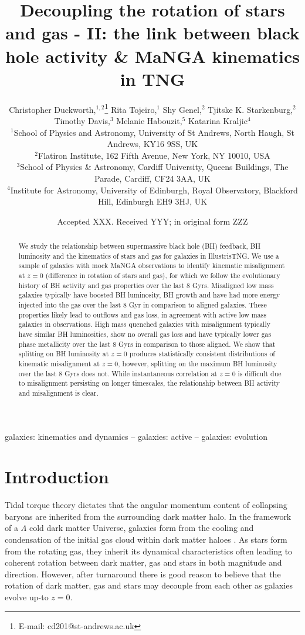 \documentclass[fleqn,usenatbib]{mnras}
\title[Decoupling the rotation of stars and gas - II]{Decoupling the rotation of stars and gas - II: the link between black hole activity \& MaNGA kinematics in TNG}
\author[C. Duckworth et al.]
{Christopher Duckworth,$^{1,2}$\thanks{E-mail: cd201@st-andrews.ac.uk}
Rita Tojeiro,$^{1}$
Shy Genel,$^{2}$ 
Tjitske K. Starkenburg,$^{2}$ \newauthor
Timothy Davis,$^{3}$
Melanie Habouzit,$^{5}$
Katarina Kraljic$^{4}$
\\
$^{1}$School of Physics and Astronomy, University of St Andrews, North Haugh, St Andrews, KY16 9SS, UK\\
$^{2}$Flatiron Institute, 162 Fifth Avenue, New York, NY 10010, USA\\
$^{3}$School of Physics \& Astronomy, Cardiff University, Queens Buildings, The Parade, Cardiff, CF24 3AA, UK\\
$^{4}$Institute for Astronomy, University of Edinburgh, Royal Observatory, Blackford Hill, Edinburgh EH9 3HJ, UK\\
}
\date{Accepted XXX. Received YYY; in original form ZZZ}
\begin{document}
\label{firstpage}
\pagerange{\pageref{firstpage}--\pageref{lastpage}}
\maketitle

\begin{abstract}
We study the relationship between supermassive black hole (BH) feedback, BH luminosity and the kinematics of stars and gas for galaxies in IllustrisTNG. We use a sample of galaxies with mock MaNGA observations to identify kinematic misalignment at $z=0$ (difference in rotation of stars and gas), for which we follow the evolutionary history of BH activity and gas properties over the last 8 Gyrs. Misaligned low mass galaxies typically have boosted BH luminosity, BH growth and have had more energy injected into the gas over the last 8 Gyr in comparison to aligned galaxies. These properties likely lead to outflows and gas loss, in agreement with active low mass galaxies in observations. High mass quenched galaxies with misalignment typically have similar BH luminosities, show no overall gas loss and have typically lower gas phase metallicity over the last 8 Gyrs in comparison to those aligned. We show that splitting on BH luminosity at $z=0$ produces statistically consistent distributions of kinematic misalignment at $z=0$, however, splitting on the maximum BH luminosity over the last 8 Gyrs does not. While instantaneous correlation at $z=0$ is difficult due to misalignment persisting on longer timescales, the relationship between BH activity and misalignment is clear.
\end{abstract}

\begin{keywords}
galaxies: kinematics and dynamics -- galaxies: active -- galaxies: evolution
\end{keywords}



\section{Introduction}
Tidal torque theory \citep[e.g.][]{hoyle1951, peebles1969} dictates that the angular momentum content of collapsing baryons are inherited from the surrounding dark matter halo. In the framework of a $\Lambda$ cold dark matter Universe, galaxies form from the cooling and condensation of the initial gas cloud within dark matter haloes \citep{fall1980, mo1998}. As stars form from the rotating gas, they inherit its dynamical characteristics often leading to coherent rotation between dark matter, gas and stars in both magnitude and direction. However, after turnaround there is good reason to believe that the rotation of dark matter, gas and stars may decouple from each other as galaxies evolve up-to $z=0$. 
\end{document}
